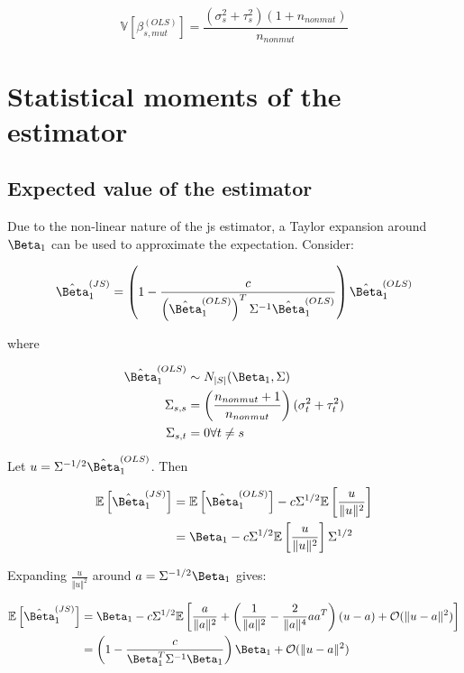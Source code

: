\begin{equation}
  \mathbb{V} \left[\beta_{s, mut}^{(OLS)} \right] = \frac{(\sigma_s^2 + \tau_s^2)(1 + n_{nonmut})}{n_{nonmut}}
\end{equation}



\section{Statistical moments of the  estimator}
\label{sec:JS_moments}

\subsection{Expected value of the  estimator}

Due to the non-linear nature of the \gls{js} estimator, a Taylor expansion around $\Beta_1$ can be used to approximate the expectation.
Consider:

\begin{equation*}
  \hat{\Beta}_1^{(JS)} = \left( 1 - \frac{c}{\left( \hat{\Beta}_1^{(OLS)} \right)^T \Sigma^{-1} \hat{\Beta}_1^{(OLS)}} \right) \hat{\Beta}_1^{(OLS)}
\end{equation*}

where

\begin{align*}
  \hat{\Beta}_1^{(OLS)} &\sim N_{|S|}(\Beta_1, \Sigma) \\
  \Sigma_{s,s} &= \left( \frac{n_{nonmut} + 1}{n_{nonmut}} \right) (\sigma_t^2 + \tau_t^2) \\
  \Sigma_{s,t} &= 0 \forall t \ne s
\end{align*}

Let $u = \Sigma^{-1/2}\hat{\Beta}_1^{(OLS)}$.
Then

\begin{align*}
  \mathbb{E}\left[ \hat{\Beta}_1^{(JS)} \right] &= \mathbb{E} \left[ \hat{\Beta}_1^{(OLS)} \right] - c\Sigma^{1/2}\mathbb{E} \left[ \frac{u}{\Vert u \Vert ^2} \right] \\
  &= \Beta_1 - c\Sigma^{1/2}\mathbb{E} \left[ \frac{u}{\Vert u \Vert ^2} \right] \Sigma^{1/2}\\
\end{align*}

Expanding $\frac{u}{\Vert u \Vert ^2}$ around $a = \Sigma^{-1/2}\Beta_1$ gives:

\begin{align*}
  \mathbb{E}\left[ \hat{\Beta}_1^{(JS)} \right]
  &= \Beta_1 - c\Sigma^{1/2}\mathbb{E} \left[ \frac{a}{\Vert a \Vert ^2} + \left( \frac{1}{\Vert a \Vert ^2}
    - \frac{2}{\Vert a \Vert ^4} aa^T\right)(u - a) + \mathcal{O}(\Vert u - a \Vert ^2)\right] \\
  & = \left(1 - \frac{c}{\Beta_1^T \Sigma^{-1} \Beta_1} \right) \Beta_1
    + \mathcal{O}(\Vert u - a \Vert ^2)
\end{align*}

